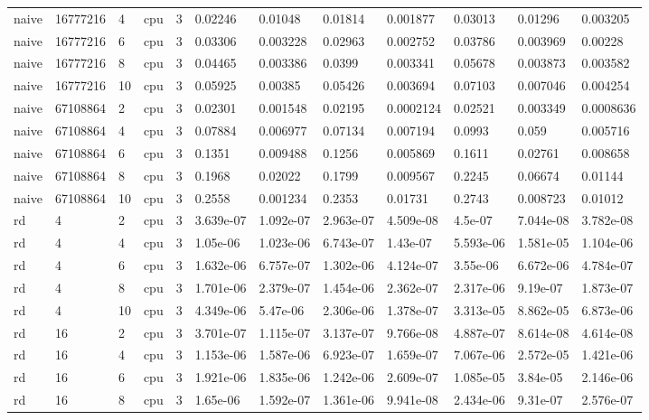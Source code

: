 \begin{tabular}{llllllllllll}
naive & 16777216 & 4 & cpu & 3 & 0.02246 & 0.01048 & 0.01814 & 0.001877 & 0.03013 & 0.01296 & 0.003205 \\
naive & 16777216 & 6 & cpu & 3 & 0.03306 & 0.003228 & 0.02963 & 0.002752 & 0.03786 & 0.003969 & 0.00228 \\
naive & 16777216 & 8 & cpu & 3 & 0.04465 & 0.003386 & 0.0399 & 0.003341 & 0.05678 & 0.003873 & 0.003582 \\
naive & 16777216 & 10 & cpu & 3 & 0.05925 & 0.00385 & 0.05426 & 0.003694 & 0.07103 & 0.007046 & 0.004254 \\
naive & 67108864 & 2 & cpu & 3 & 0.02301 & 0.001548 & 0.02195 & 0.0002124 & 0.02521 & 0.003349 & 0.0008636 \\
naive & 67108864 & 4 & cpu & 3 & 0.07884 & 0.006977 & 0.07134 & 0.007194 & 0.0993 & 0.059 & 0.005716 \\
naive & 67108864 & 6 & cpu & 3 & 0.1351 & 0.009488 & 0.1256 & 0.005869 & 0.1611 & 0.02761 & 0.008658 \\
naive & 67108864 & 8 & cpu & 3 & 0.1968 & 0.02022 & 0.1799 & 0.009567 & 0.2245 & 0.06674 & 0.01144 \\
naive & 67108864 & 10 & cpu & 3 & 0.2558 & 0.001234 & 0.2353 & 0.01731 & 0.2743 & 0.008723 & 0.01012 \\
rd & 4 & 2 & cpu & 3 & 3.639e-07 & 1.092e-07 & 2.963e-07 & 4.509e-08 & 4.5e-07 & 7.044e-08 & 3.782e-08 \\
rd & 4 & 4 & cpu & 3 & 1.05e-06 & 1.023e-06 & 6.743e-07 & 1.43e-07 & 5.593e-06 & 1.581e-05 & 1.104e-06 \\
rd & 4 & 6 & cpu & 3 & 1.632e-06 & 6.757e-07 & 1.302e-06 & 4.124e-07 & 3.55e-06 & 6.672e-06 & 4.784e-07 \\
rd & 4 & 8 & cpu & 3 & 1.701e-06 & 2.379e-07 & 1.454e-06 & 2.362e-07 & 2.317e-06 & 9.19e-07 & 1.873e-07 \\
rd & 4 & 10 & cpu & 3 & 4.349e-06 & 5.47e-06 & 2.306e-06 & 1.378e-07 & 3.313e-05 & 8.862e-05 & 6.873e-06 \\
rd & 16 & 2 & cpu & 3 & 3.701e-07 & 1.115e-07 & 3.137e-07 & 9.766e-08 & 4.887e-07 & 8.614e-08 & 4.614e-08 \\
rd & 16 & 4 & cpu & 3 & 1.153e-06 & 1.587e-06 & 6.923e-07 & 1.659e-07 & 7.067e-06 & 2.572e-05 & 1.421e-06 \\
rd & 16 & 6 & cpu & 3 & 1.921e-06 & 1.835e-06 & 1.242e-06 & 2.609e-07 & 1.085e-05 & 3.84e-05 & 2.146e-06 \\
rd & 16 & 8 & cpu & 3 & 1.65e-06 & 1.592e-07 & 1.361e-06 & 9.941e-08 & 2.434e-06 & 9.31e-07 & 2.576e-07 \\

\end{tabular}
